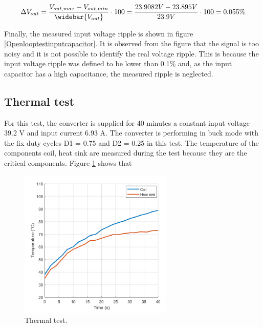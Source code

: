 \begin{equation} \label{eq:output_voltage_rippleexperiment}
\Delta V_{out} = \frac{V_{out,max}-V_{out,min}}{\widebar{V_{out}}} \cdot 100 = \frac{23.9082V - 23.895V }{23.9V} \cdot 100 = 0.055\%
\end{equation}

Finally, the measured input voltage ripple is shown in figure \ref{Openlooptestinputcapacitor}. It is observed from the figure that the signal is too noisy and it is not possible to identify the real voltage ripple. This is because the input voltage ripple was defined to be lower than 0.1\% and, as the input capacitor has a high capacitance, the measured ripple is neglected. 

\subsection{Thermal test}

For this test, the converter is supplied for 40 minutes a constant input voltage 39.2 V and input current 6.93 A. The converter is performing in buck mode with the fix duty cycles D1 = 0.75 and D2 = 0.25 in this test. The temperature of the components coil, heat sink are measured during the test because they are the critical components. Figure \ref{Testthermal} shows that 

\begin{figure}[H]
	\begin{center}
		\includegraphics[width=0.65\textwidth]{../Pictures/P1/Test/Thermal_test_with_heat_sink}
		\caption{Thermal test.}
		\label{Testthermal}
	\end{center}	
\end{figure}

